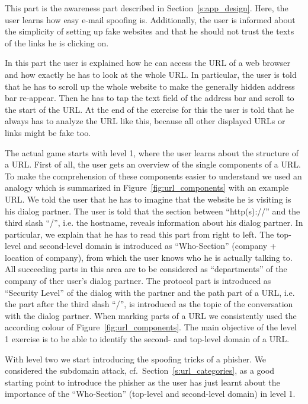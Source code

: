 \begin{description}[leftmargin=0cm]
	\item[Introduction 1] This part is the awareness part described in Section~\ref{s:app_design}. Here, the user learns how easy e-mail spoofing is. Additionally, the user is informed about the simplicity of setting up fake websites and that he should not trust the texts of the links he is clicking on.
	\item[Introduction 2] In this part the user is explained how he can access the URL of a web browser and how exactly he has to look at the whole URL. In particular, the user is told that he has to scroll up the whole website to make the generally hidden address bar re-appear. Then he has to tap the text field of the address bar and scroll to the start of the URL. At the end of the exercise for this the user is told that he always has to analyze the URL like this, because all other displayed URLs or links might be fake too.
	\item[Level 1] The actual game starts with level 1, where the user learns about the structure of a URL. First of all, the user gets an overview of the single components of a URL. To make the comprehension of these components easier to understand we used an analogy which is summarized in Figure~\ref{fig:url_components} with an example URL. We told the user that he has to imagine that the website he is visiting is his dialog partner. The user is told that the section between ``http(s)://'' and the third slash ``/'', i.e. the hostname, reveals information about his dialog partner. In particular, we explain that he has to read this part from right to left. The top-level and second-level domain is introduced as ``Who-Section'' (company + location of company), from which the user knows who he is actually talking to. All succeeding parts in this area are to be considered as ``departments'' of the company of ther user's dialog partner. The protocol part is introduced as ``Security Level'' of the dialog with the partner and the path part of a URL, i.e. the part after the third slash ``/'', is introduced as the topic of the conversation with the dialog partner. When marking parts of a URL we consistently used the according colour of Figure~\ref{fig:url_components}. The main objective of the level 1 exercise is to be able to identify the second- and top-level domain of a URL.
	\item[Level 2] With level two we start introducing the spoofing tricks of a phisher. We considered the subdomain attack, cf.~Section~\ref{s:url_categories}, as a good starting point to introduce the phisher as the user has just learnt about the importance of the ``Who-Section'' (top-level and second-level domain) in level 1.

\end{description}
